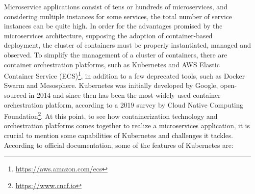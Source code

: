 \documentclass{Configuration_Files/PoliMi3i_thesis}
\begin{document}
Microservice applications consist of tens or hundreds of microservices, and considering multiple instances for some services, the total number of service instances can be quite high.
In order for the advantages promised by the microservices architecture, supposing the adoption of container-based deployment, the cluster of containers must be properly instantiated, managed and observed.
To simplify the management of a cluster of containers, there are container orchestration platforms, such as Kubernetes and AWS Elastic Container Service (ECS)\footnote{\href{https://aws.amazon.com/ecs}{https://aws.amazon.com/ecs}}, in addition to a few deprecated tools, such as Docker Swarm and Mesosphere.
Kubernetes was initially developed by Google, open-sourced in 2014 and since then has been the most widely used container orchestration platform, according to a 2019 survey\cite{hackernoon} by Cloud Native Computing Foundation\footnote{\href{https://www.cncf.io}{https://www.cncf.io}}.
At this point, to see how containerization technology and orchestration platforms comes together to realize a microservices application, it is crucial to mention some capabilities of Kubernetes and challenges it tackles.
According to official documentation\cite{kubernetes_docs}, some of the features of Kubernetes are:
\end{document}
